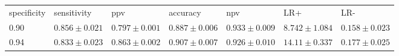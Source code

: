\begin{tabular}{L{.69in}|L{.75in}|L{.75in}|L{.75in}|L{.75in}|L{.75in}|L{.75in}}\hline
specificity&sensitivity&ppv&accuracy&npv&LR+&LR-\\
0.90& $0.856  \pm  0.021$ & $0.797  \pm  0.001$ & $0.887  \pm  0.006$ & $0.933  \pm  0.009$ & $8.742  \pm  1.084$ & $0.158  \pm  0.023$ \\
0.94& $0.833  \pm  0.023$ & $0.863  \pm  0.002$ & $0.907  \pm  0.007$ & $0.926  \pm  0.010$ & $14.11  \pm  0.337$ & $0.177  \pm  0.025$ \\
\hline\end{tabular}

